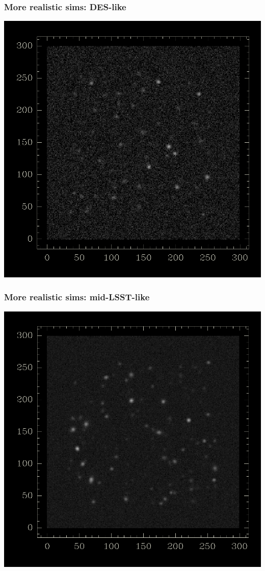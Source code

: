 \documentclass{beamer}
\begin{document}
\begin{frame}
    \frametitle{More realistic sims: DES-like}
 
    \begin{center}
        \includegraphics[height=0.8\textheight]{10persqarcmin.png}
    \end{center}
\end{frame}

\begin{frame}
    \frametitle{More realistic sims: mid-LSST-like}
 
    \begin{center}
        \includegraphics[height=0.8\textheight]{35persqarcmin.png}
    \end{center}

\end{frame}
\end{document}
